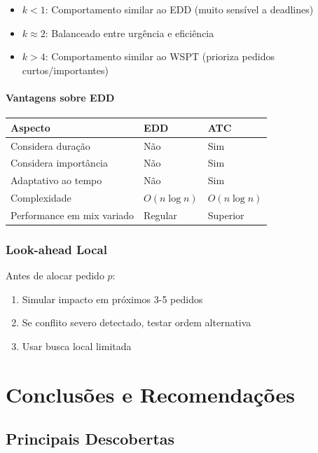\documentclass[11pt,a4paper]{article}
\begin{document}
\begin{itemize}
    \item $k < 1$: Comportamento similar ao EDD (muito sensível a deadlines)
    \item $k \approx 2$: Balanceado entre urgência e eficiência
    \item $k > 4$: Comportamento similar ao WSPT (prioriza pedidos curtos/importantes)
\end{itemize}

\paragraph{Vantagens sobre EDD}

\begin{center}
\begin{tabular}{lll}
\toprule
\textbf{Aspecto} & \textbf{EDD} & \textbf{ATC} \\
\midrule
Considera duração & Não & Sim \\
Considera importância & Não & Sim \\
Adaptativo ao tempo & Não & Sim \\
Complexidade & $O(n \log n)$ & $O(n \log n)$ \\
Performance em mix variado & Regular & Superior \\
\bottomrule
\end{tabular}
\end{center}
\subsubsection{Look-ahead Local}

Antes de alocar pedido $p$:
\begin{enumerate}
    \item Simular impacto em próximos 3-5 pedidos
    \item Se conflito severo detectado, testar ordem alternativa
    \item Usar busca local limitada
\end{enumerate}

\section{Conclusões e Recomendações}

\subsection{Principais Descobertas}
\end{document}
